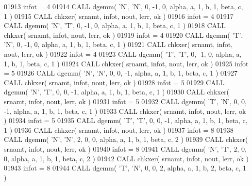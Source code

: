 \begin{DoxyCode}
01913       infot = 4
01914       \textcolor{keyword}{CALL }dgemm( \textcolor{stringliteral}{'N'}, \textcolor{stringliteral}{'N'}, 0, -1, 0, alpha, a, 1, b, 1, beta, c, 1 )
01915       \textcolor{keyword}{CALL }chkxer( srnamt, infot, nout, lerr, ok )
01916       infot = 4
01917       \textcolor{keyword}{CALL }dgemm( \textcolor{stringliteral}{'N'}, \textcolor{stringliteral}{'T'}, 0, -1, 0, alpha, a, 1, b, 1, beta, c, 1 )
01918       \textcolor{keyword}{CALL }chkxer( srnamt, infot, nout, lerr, ok )
01919       infot = 4
01920       \textcolor{keyword}{CALL }dgemm( \textcolor{stringliteral}{'T'}, \textcolor{stringliteral}{'N'}, 0, -1, 0, alpha, a, 1, b, 1, beta, c, 1 )
01921       \textcolor{keyword}{CALL }chkxer( srnamt, infot, nout, lerr, ok )
01922       infot = 4
01923       \textcolor{keyword}{CALL }dgemm( \textcolor{stringliteral}{'T'}, \textcolor{stringliteral}{'T'}, 0, -1, 0, alpha, a, 1, b, 1, beta, c, 1 )
01924       \textcolor{keyword}{CALL }chkxer( srnamt, infot, nout, lerr, ok )
01925       infot = 5
01926       \textcolor{keyword}{CALL }dgemm( \textcolor{stringliteral}{'N'}, \textcolor{stringliteral}{'N'}, 0, 0, -1, alpha, a, 1, b, 1, beta, c, 1 )
01927       \textcolor{keyword}{CALL }chkxer( srnamt, infot, nout, lerr, ok )
01928       infot = 5
01929       \textcolor{keyword}{CALL }dgemm( \textcolor{stringliteral}{'N'}, \textcolor{stringliteral}{'T'}, 0, 0, -1, alpha, a, 1, b, 1, beta, c, 1 )
01930       \textcolor{keyword}{CALL }chkxer( srnamt, infot, nout, lerr, ok )
01931       infot = 5
01932       \textcolor{keyword}{CALL }dgemm( \textcolor{stringliteral}{'T'}, \textcolor{stringliteral}{'N'}, 0, 0, -1, alpha, a, 1, b, 1, beta, c, 1 )
01933       \textcolor{keyword}{CALL }chkxer( srnamt, infot, nout, lerr, ok )
01934       infot = 5
01935       \textcolor{keyword}{CALL }dgemm( \textcolor{stringliteral}{'T'}, \textcolor{stringliteral}{'T'}, 0, 0, -1, alpha, a, 1, b, 1, beta, c, 1 )
01936       \textcolor{keyword}{CALL }chkxer( srnamt, infot, nout, lerr, ok )
01937       infot = 8
01938       \textcolor{keyword}{CALL }dgemm( \textcolor{stringliteral}{'N'}, \textcolor{stringliteral}{'N'}, 2, 0, 0, alpha, a, 1, b, 1, beta, c, 2 )
01939       \textcolor{keyword}{CALL }chkxer( srnamt, infot, nout, lerr, ok )
01940       infot = 8
01941       \textcolor{keyword}{CALL }dgemm( \textcolor{stringliteral}{'N'}, \textcolor{stringliteral}{'T'}, 2, 0, 0, alpha, a, 1, b, 1, beta, c, 2 )
01942       \textcolor{keyword}{CALL }chkxer( srnamt, infot, nout, lerr, ok )
01943       infot = 8
01944       \textcolor{keyword}{CALL }dgemm( \textcolor{stringliteral}{'T'}, \textcolor{stringliteral}{'N'}, 0, 0, 2, alpha, a, 1, b, 2, beta, c, 1 )

\end{DoxyCode}
